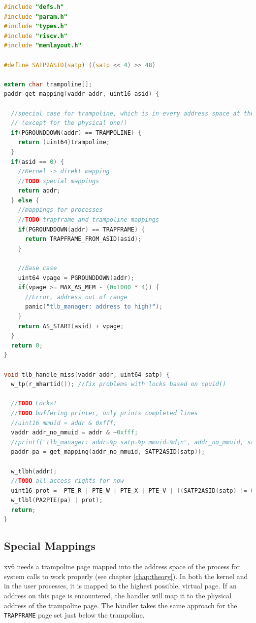 \begin{lstlisting}[language=c,float=h!,
    label={lst:handler}]
#include "defs.h"
#include "param.h"
#include "types.h"
#include "riscv.h"
#include "memlayout.h"

#define SATP2ASID(satp) ((satp << 4) >> 48)

extern char trampoline[];
paddr get_mapping(vaddr addr, uint16 asid) {

  //special case for trampoline, which is in every address space at the same address
  // (except for the physical one!)
  if(PGROUNDDOWN(addr) == TRAMPOLINE) {
    return (uint64)trampoline;
  }
  if(asid == 0) {
    //Kernel -> direkt mapping
    //TODO special mappings
    return addr;
  } else {
    //mappings for processes
    //TODO trapframe and trampoline mappings
    if(PGROUNDDOWN(addr) == TRAPFRAME) {
      return TRAPFRAME_FROM_ASID(asid);
    }

    //Base case
    uint64 vpage = PGROUNDDOWN(addr);
    if(vpage >= MAX_AS_MEM - (0x1000 * 4)) {
      //Error, address out of range
      panic("tlb_manager: address to high!");
    }
    return AS_START(asid) + vpage;
  }
  return 0;
}

void tlb_handle_miss(vaddr addr, uint64 satp) {
  w_tp(r_mhartid()); //fix problems with locks based on cpuid()

  //TODO Locks!
  //TODO buffering printer, only prints completed lines
  //uint16 mmuid = addr & 0xfff;
  vaddr addr_no_mmuid = addr & ~0xfff;
  //printf("tlb_manager: addr=%p satp=%p mmuid=%d\n", addr_no_mmuid, satp, mmuid);
  paddr pa = get_mapping(addr_no_mmuid, SATP2ASID(satp));

  w_tlbh(addr);
  //TODO all access rights for now
  uint16 prot =  PTE_R | PTE_W | PTE_X | PTE_V | ((SATP2ASID(satp) != 0) ? PTE_U : 0);
  w_tlbl(PA2PTE(pa) | prot);
  return;
}
\end{lstlisting}


\subsection{Special Mappings}
xv6 needs a trampoline page mapped into the address space of the process for system calls to work properly (see chapter \ref{chap:theory}).
In both the kernel and in the user processes, it is mapped to the highest possible, virtual page.
If an address on this page is encountered, the handler will map it to the physical address of the trampoline page.
The handler takes the same approach for the \texttt{TRAPFRAME} page set just below the trampoline.


